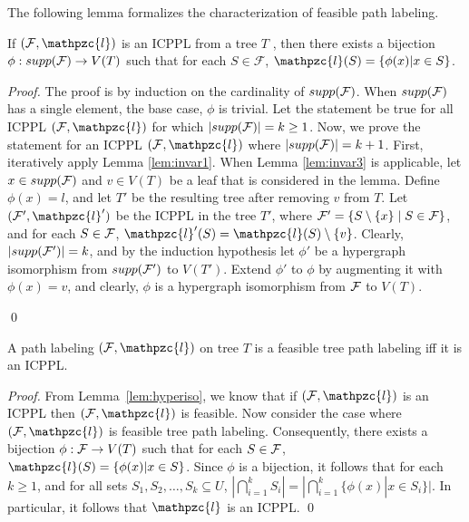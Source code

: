 \documentclass[envcountsect, envcountsame, 11pt]{../lib/llncs2e/llncs}
\def\cF{{\cal F}}
\def\F{{\mathcal F}}
\def\cl{\mathpzc{l}}
\begin{document}
\noindent
The following lemma formalizes
the characterization of feasible path labeling.
\begin{lemma}
  \label{lem:hyperiso}  %
  If $(\cF, \cl)$ is an ICPPL from a tree $T$ , then there exists a bijection $\phi :
  supp(\cF) \rightarrow V(T)$ such that for each $S \in \F$, $\cl(S) = \{\phi(x)|x \in S\}$.
\end{lemma}
\begin{proof}
The proof is by induction on the cardinality of $supp(\cF)$.  When $supp(\cF)$ has a single 
element, the base case, $\phi$ is trivial. Let the statement be true for all ICPPL $(\cF,\cl)$ for which
$|supp(\cF)| = k \geq 1$.  Now, we prove the statement for an ICPPL $(\cF,\cl)$ where $|supp(\cF)| = k+1$.
 First, iteratively apply
Lemma \ref{lem:invar1}.  When Lemma \ref{lem:invar3} is applicable, let $x \in supp(\cF)$ and $v \in V(T)$ be a leaf
that is considered in the lemma.  Define $\phi(x) = l$, and let $T'$ be the
resulting tree after removing $v$ from
$T$.  Let $(\cF',\cl')$  be the ICPPL in the tree $T'$, where $\cF' = \{S \setminus \{x\} \mid S \in \cF\}$, and 
for each $S \in \cF$, $\cl'(S) = \cl(S) \setminus \{v\}$.  Clearly, $|supp(\cF')| = k$, and by the induction hypothesis
let $\phi'$ be a hypergraph isomorphism from $supp(\cF')$ to $V(T')$.  Extend $\phi'$ to $\phi$ by augmenting it with
$\phi(x) = v$, and clearly, $\phi$ is a hypergraph isomorphism from $\cF$ to $V(T)$. 
 
 \qed
\end{proof}
\begin{theorem}
  \label{th:charac}
  A path labeling $(\cF, \cl)$ on tree $T$ is a feasible tree path labeling iff it is an
  ICPPL.
\end{theorem}
\begin{proof}
  From Lemma~\ref{lem:hyperiso}, we know that if $(\cF, \cl)$ is an
  ICPPL  then $(\cF, \cl)$ is feasible.
  Now consider the case where $(\cF, \cl)$ is feasible tree path labeling.  Consequently, there
  exists a bijection $\phi:\cF \rightarrow V(T)$ such that for each $S \in \cF$, $\cl(S) = \{\phi(x)| x \in S\}$.  
  Since $\phi$ is a bijection, it follows that for each $k \geq 1$, and for all sets $S_1, S_2, \ldots, S_k \subseteq U$, $\displaystyle |\bigcap_{i=1}^k S_i|  =  |\bigcap_{i=1}^k\{\phi(x)| x \in S_i\}|$.  In particular, it follows that $\cl$ is an ICPPL. \qed
\end{proof}
\end{document}

